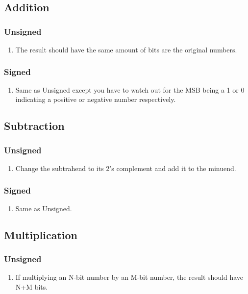 \documentclass[12pt]{article}
\begin{document}
\subsection*{Addition}
\subsubsection*{Unsigned}
\begin{enumerate}
	\item{The result should have the same amount of bits are the original numbers.}
\end{enumerate}

\subsubsection*{Signed}
\begin{enumerate}
	\item{Same as Unsigned except you have to watch out for the MSB being a 1 or 0 indicating a positive or negative number respectively.}
\end{enumerate}

\subsection*{Subtraction}
\subsubsection*{Unsigned}
\begin{enumerate}
	\item{Change the subtrahend to its 2's complement and add it to the minuend.}
\end{enumerate}

\subsubsection*{Signed}
\begin{enumerate}
	\item{Same as Unsigned.}
\end{enumerate}

\subsection*{Multiplication}
\subsubsection*{Unsigned}
\begin{enumerate}
	\item{If multiplying an N-bit number by an M-bit number, the result should have N+M bits.}
\end{enumerate}
\end{document}
